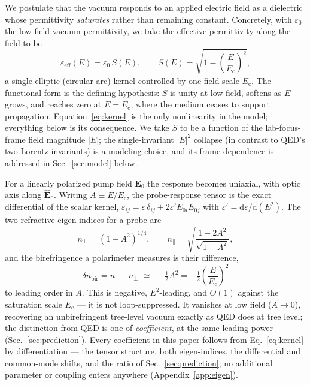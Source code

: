 \documentclass[aps,prd,twocolumn,superscriptaddress,nofootinbib,longbibliography]{revtex4-2}
\newcommand{\Ec}{E_{\mathrm{c}}}
\newcommand{\dnbir}{\delta n_{\mathrm{bir}}}
\begin{document}
We postulate that the vacuum responds to an applied electric field as a
dielectric whose permittivity \emph{saturates} rather than remaining constant.
Concretely, with $\varepsilon_0$ the low-field vacuum permittivity, we take the
effective permittivity along the field to be
%
\begin{equation}
  \varepsilon_{\mathrm{eff}}(E)=\varepsilon_0\,S(E),\qquad
  S(E)=\sqrt{1-\left(\frac{E}{\Ec}\right)^2},
  \label{eq:kernel}
\end{equation}
%
a single elliptic (circular-arc) kernel controlled by one field scale $\Ec$.
The functional form is the defining hypothesis: $S$ is unity at low field,
softens as $E$ grows, and reaches zero at $E=\Ec$, where the medium ceases to
support propagation. Equation~\eqref{eq:kernel} is the only nonlinearity in the
model; everything below is its consequence. We take $S$ to be a function of the
lab-focus-frame field magnitude $|E|$; the single-invariant $|E|^2$ collapse (in
contrast to QED's two Lorentz invariants) is a modeling choice, and its frame
dependence is addressed in Sec.~\ref{sec:model} below.

For a linearly polarized pump field $\mathbf E_0$ the response becomes uniaxial,
with optic axis along $\hat{\mathbf E}_0$. Writing $A\equiv E/\Ec$, the
probe-response tensor is the exact differential of the scalar kernel,
$\varepsilon_{ij}=\varepsilon\,\delta_{ij}+2\varepsilon'E_{0i}E_{0j}$ with
$\varepsilon'=\mathrm d\varepsilon/\mathrm d(E^2)$. The two refractive
eigen-indices for a probe are
%
\begin{equation}
  n_\perp=(1-A^2)^{1/4},\qquad
  n_\parallel=\sqrt{\frac{1-2A^2}{\sqrt{1-A^2}}},
  \label{eq:eigenindices}
\end{equation}
%
and the birefringence a polarimeter measures is their difference,
%
\begin{equation}
  \boxed{\;\dnbir=n_\parallel-n_\perp\;\simeq\;-\tfrac12 A^2
  =-\tfrac12\left(\frac{E}{\Ec}\right)^2\;}
  \label{eq:dnbir}
\end{equation}
%
to leading order in $A$. This is negative, $E^2$-leading, and $O(1)$ against the
saturation scale $\Ec$ --- it is not loop-suppressed. It vanishes at low field
($A\to0$), recovering an unbirefringent tree-level vacuum exactly as QED does at
tree level; the distinction from QED is one of \emph{coefficient}, at the same
leading power (Sec.~\ref{sec:prediction}). Every coefficient in this paper
follows from Eq.~\eqref{eq:kernel} by differentiation --- the tensor structure,
both eigen-indices, the differential and common-mode shifts, and the ratio of
Sec.~\ref{sec:prediction}; no additional parameter or coupling enters anywhere
(Appendix~\ref{app:eigen}).
\end{document}
